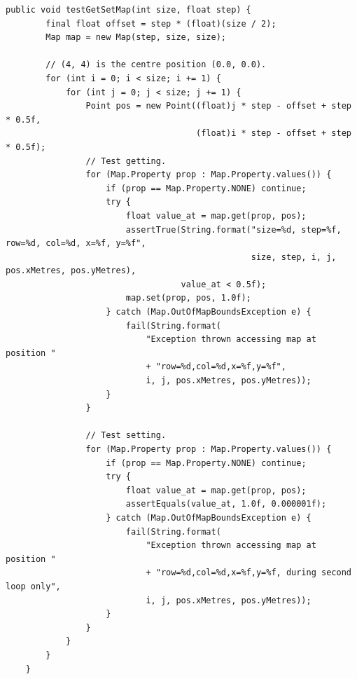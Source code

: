 \documentclass[12pt,a4paper]{article}
\begin{document}
    \begin{lstlisting}[caption=Map automated test suite 1, captionpos=b, label={lst:MapAutomatedTestSuite1}]
     public void testGetSetMap(int size, float step) {
        final float offset = step * (float)(size / 2);
        Map map = new Map(step, size, size);
        
        // (4, 4) is the centre position (0.0, 0.0).
        for (int i = 0; i < size; i += 1) {
            for (int j = 0; j < size; j += 1) {
                Point pos = new Point((float)j * step - offset + step * 0.5f,
                                      (float)i * step - offset + step * 0.5f);
                // Test getting.
                for (Map.Property prop : Map.Property.values()) {
                    if (prop == Map.Property.NONE) continue;
                    try {
                        float value_at = map.get(prop, pos);
                        assertTrue(String.format("size=%d, step=%f, row=%d, col=%d, x=%f, y=%f",
                                                 size, step, i, j, pos.xMetres, pos.yMetres),
                                   value_at < 0.5f);
                        map.set(prop, pos, 1.0f);
                    } catch (Map.OutOfMapBoundsException e) {
                        fail(String.format(
                            "Exception thrown accessing map at position "
                            + "row=%d,col=%d,x=%f,y=%f",
                            i, j, pos.xMetres, pos.yMetres));
                    }
                }
                
                // Test setting.
                for (Map.Property prop : Map.Property.values()) {
                    if (prop == Map.Property.NONE) continue;
                    try {
                        float value_at = map.get(prop, pos);
                        assertEquals(value_at, 1.0f, 0.000001f);
                    } catch (Map.OutOfMapBoundsException e) {
                        fail(String.format(
                            "Exception thrown accessing map at position "
                            + "row=%d,col=%d,x=%f,y=%f, during second loop only",
                            i, j, pos.xMetres, pos.yMetres));
                    }
                }
            }
        }
    }
     \end{lstlisting}
     
\end{document}
